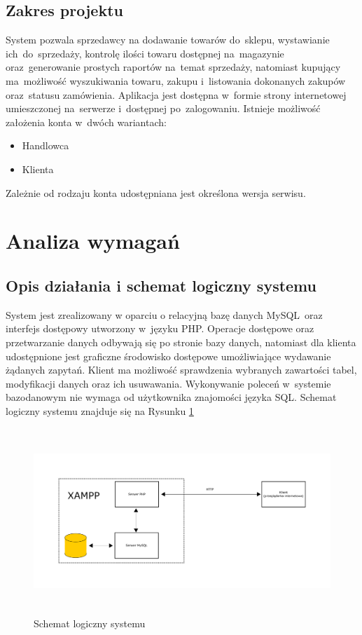 \documentclass[a4paper, 12pt]{article}
\begin{document}
\subsection{Zakres projektu}
System pozwala sprzedawcy na dodawanie towarów do~sklepu, wystawianie ich~do~sprzedaży, kontrolę ilości towaru dostępnej na~magazynie oraz~generowanie prostych raportów na~temat sprzedaży, natomiast kupujący ma~możliwość wyszukiwania towaru, zakupu i~listowania dokonanych zakupów oraz~statusu zamówienia. Aplikacja jest dostępna w~formie strony internetowej umieszczonej na~serwerze i~dostępnej po~zalogowaniu. Istnieje możliwość założenia konta w~dwóch wariantach:
\begin{itemize}
	\item Handlowca
	\item Klienta
\end{itemize}
Zależnie od rodzaju konta udostępniana jest określona wersja serwisu.
\section{Analiza wymagań}
\subsection{Opis działania i schemat logiczny systemu}
System jest zrealizowany w oparciu o relacyjną bazę danych MySQL~oraz interfejs dostępowy utworzony w~języku PHP. Operacje dostępowe oraz przetwarzanie danych odbywają się po stronie bazy danych, natomiast dla klienta udostępnione jest graficzne środowisko dostępowe umożliwiające wydawanie żądanych zapytań. Klient ma możliwość sprawdzenia wybranych zawartości tabel, modyfikacji danych oraz ich usuwawania. Wykonywanie poleceń w~systemie bazodanowym nie wymaga od użytkownika znajomości języka SQL.
Schemat logiczny systemu znajduje się na Rysunku \ref{fig:schematLogiczny}

\begin{figure}[H]
	\includegraphics[height=7cm]{schemat.png}
	\caption[Schemat logiczny systemu]{Schemat logiczny systemu}
	\label{fig:schematLogiczny}
\end{figure}
\end{document}
